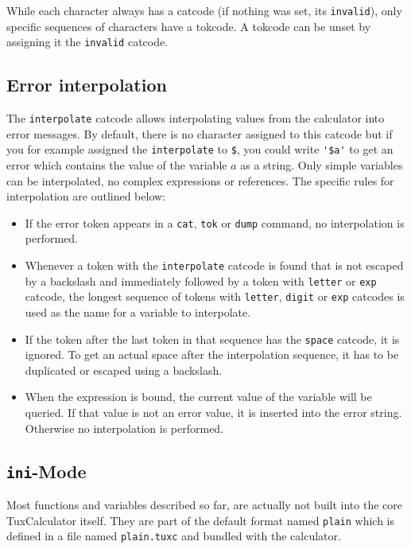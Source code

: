 \documentclass[10pt]{article}
\begin{document}
    While each character always has a catcode (if nothing was set, its \verb|invalid|), only specific sequences of characters have a tokcode.
    A tokcode can be unset by assigning it the \verb|invalid| catcode.

    \subsection{Error interpolation}\label{subsec:errinterp}
    The \verb|interpolate| catcode allows interpolating values from the calculator into error messages.
    By default, there is no character assigned to this catcode but if you for example assigned the \verb|interpolate| to \verb|$|, you could write \verb|'$a'| to get an error which contains the value of the variable $ a $ as a string.
    Only simple variables can be interpolated, no complex expressions or references.
    The specific rules for interpolation are outlined below:
    \begin{itemize}
        \item If the error token appears in a \verb|cat|, \verb|tok| or \verb|dump| command, no interpolation is performed.
        \item Whenever a token with the \verb|interpolate| catcode is found that is not escaped by a backslash and immediately followed by a token with \verb|letter| or \verb|exp| catcode, the longest sequence of tokens with \verb|letter|, \verb|digit| or \verb|exp| catcodes is used as the name for a variable to interpolate.
        \item If the token after the last token in that sequence has the \verb|space| catcode, it is ignored.
              To get an actual space after the interpolation sequence, it has to be duplicated or escaped using a backslash.
        \item When the expression is bound, the current value of the variable will be queried.
              If that value is not an error value, it is inserted into the error string.
              Otherwise no interpolation is performed.
    \end{itemize}
    
    \subsection{\texttt{ini}-Mode}\label{subsec:inimode}
    Most functions and variables described so far, are actually not built into the core TuxCalculator itself.
    They are part of the default format named \verb|plain| which is defined in a file named \verb|plain.tuxc| and bundled with the calculator.
    
\end{document}
